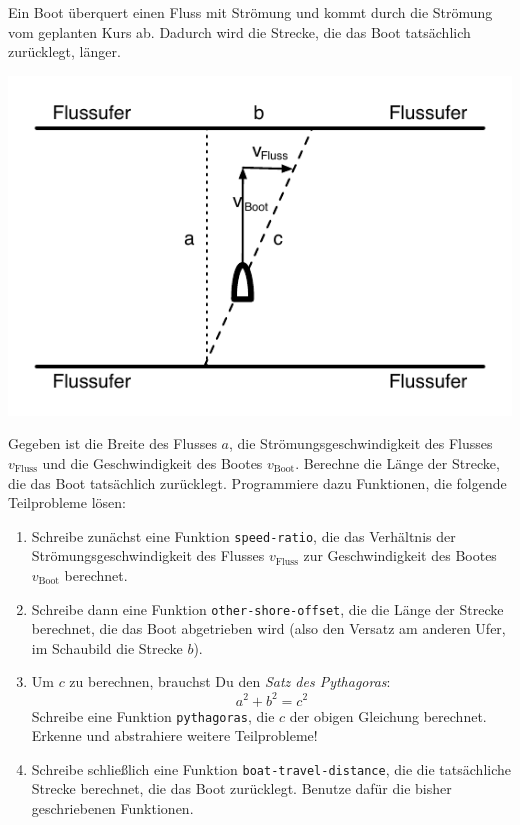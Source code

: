 \begin{aufgabe}

 Ein Boot überquert einen Fluss mit Strömung und
  kommt durch die Strömung vom geplanten Kurs ab.  Dadurch wird die
  Strecke, die das Boot tatsächlich zurücklegt, länger.

  \begin{center}
    \includegraphics{riverboat}
  \end{center}

  Gegeben ist die Breite des Flusses $a$, die Strömungsgeschwindigkeit
  des Flusses $v_{\text{Fluss}}$ und die Geschwindigkeit des Bootes
  $v_{\text{Boot}}$.  Berechne die Länge der Strecke, die das
  Boot tatsächlich zurücklegt.  Programmiere dazu Funktionen, die
  folgende Teilprobleme lösen:

  \begin{enumerate}
  \item Schreibe zunächst eine Funktion \texttt{speed-ratio}, die
    das Verhältnis der Strömungsgeschwindigkeit des Flusses
    $v_{\text{Fluss}}$ zur Geschwindigkeit des Bootes
    $v_{\text{Boot}}$ berechnet.

  \item Schreibe dann eine Funktion \texttt{other-shore-offset},
    die die Länge der Strecke berechnet, die das Boot abgetrieben wird
    (also den Versatz am anderen Ufer, im Schaubild die Strecke $b$).

  \item Um $c$ zu berechnen, brauchst Du den \textit{Satz des
      Pythagoras}:
    \begin{displaymath}
      a^2 + b^2 = c^2
    \end{displaymath}
    Schreibe eine Funktion \texttt{pythagoras}, die $c$ der
    obigen Gleichung berechnet.  Erkenne und abstrahiere weitere
    Teilprobleme!

  \item Schreibe schließlich eine Funktion
    \texttt{boat-travel-distance}, die die tatsächliche Strecke
    berechnet, die das Boot zurücklegt.  Benutze dafür die bisher
    geschriebenen Funktionen.
  \end{enumerate}
\end{aufgabe}

